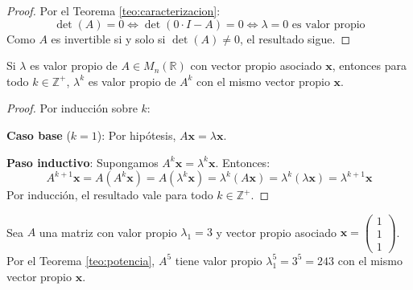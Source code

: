 \begin{proof}
Por el Teorema \ref{teo:caracterizacion}:
\[
\det(A) = 0 \iff \det(0 \cdot I - A) = 0 \iff \lambda = 0 \text{ es valor propio}
\]
Como $A$ es invertible si y solo si $\det(A) \neq 0$, el resultado sigue.
\end{proof}

\begin{theorem}\label{teo:potencia}
Si $\lambda$ es valor propio de $A \in M_n(\mathbb{R})$ con vector propio asociado $\mathbf{x}$, entonces para todo $k \in \mathbb{Z}^+$, $\lambda^k$ es valor propio de $A^k$ con el mismo vector propio $\mathbf{x}$.
\end{theorem}

\begin{proof}
Por inducción sobre $k$:

\textbf{Caso base} ($k=1$): Por hipótesis, $A\mathbf{x} = \lambda\mathbf{x}$.

\textbf{Paso inductivo}: Supongamos $A^k\mathbf{x} = \lambda^k\mathbf{x}$. Entonces:
\[
A^{k+1}\mathbf{x} = A(A^k\mathbf{x}) = A(\lambda^k\mathbf{x}) = \lambda^k(A\mathbf{x}) = \lambda^k(\lambda\mathbf{x}) = \lambda^{k+1}\mathbf{x}
\]
Por inducción, el resultado vale para todo $k \in \mathbb{Z}^+$.
\end{proof}

\begin{example}
Sea $A$ una matriz con valor propio $\lambda_1 = 3$ y vector propio asociado $\mathbf{x} = \begin{pmatrix} 1 \\ 1 \\ 1 \end{pmatrix}$. Por el Teorema \ref{teo:potencia}, $A^5$ tiene valor propio $\lambda_1^5 = 3^5 = 243$ con el mismo vector propio $\mathbf{x}$.
\end{example}


